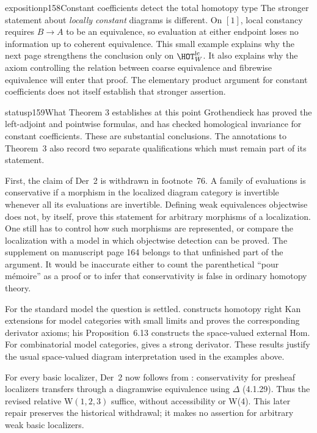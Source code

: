 \begin{dcomment}{exposition}{p158}{Constant coefficients detect the total homotopy type}
The stronger statement about \emph{locally constant} diagrams is different. On $[1]$, local constancy requires $B\longrightarrow A$ to be an equivalence, so evaluation at either endpoint loses no information up to coherent equivalence. This small example explains why the next page strengthens the conclusion only on $\HOT_W^{\mathrm{lc}}$. It also explains why the axiom controlling the relation between coarse equivalence and fibrewise equivalence will enter that proof. The elementary product argument for constant coefficients does not itself establish that stronger assertion.
\end{dcomment}

\begin{dcomment}{status}{p159}{What Theorem 3 establishes at this point}
Grothendieck has proved the left-adjoint and pointwise formulas, and has checked homological invariance for constant coefficients. These are substantial conclusions. The annotations to Theorem~3 also record two separate qualifications which must remain part of its statement.

First, the claim of Der~2 is withdrawn in footnote~76. A family of evaluations is conservative if a morphism in the localized diagram category is invertible whenever all its evaluations are invertible. Defining weak equivalences objectwise does not, by itself, prove this statement for arbitrary morphisms of a localization. One still has to control how such morphisms are represented, or compare the localization with a model in which objectwise detection can be proved. The supplement on manuscript page 164 belongs to that unfinished part of the argument. It would be inaccurate either to count the parenthetical ``pour mémoire'' as a proof or to infer that conservativity is false in ordinary homotopy theory.

For the standard model the question is settled. \citet[Theorem~6.11, including its proof of Der~2]{Cisinski2003} constructs homotopy right Kan extensions for model categories with small limits and proves the corresponding derivator axioms; his Proposition~6.13 constructs the space-valued external Hom. For combinatorial model categories, \citet[Proposition~1.30]{Groth2013} gives a strong derivator. These results justify the usual space-valued diagram interpretation used in the examples above.

For every basic localizer, Der~2 now follows from \citet[Propositions~3.1.30 and~4.2.7]{Cisinski2006}: conservativity for presheaf localizers transfers through a diagramwise equivalence using $\Delta$ (4.1.29). Thus the revised relative W$(1,2,3)$ suffice, without accessibility or W(4). This later repair preserves the historical withdrawal; it makes no assertion for arbitrary weak basic localizers.


\end{dcomment}
